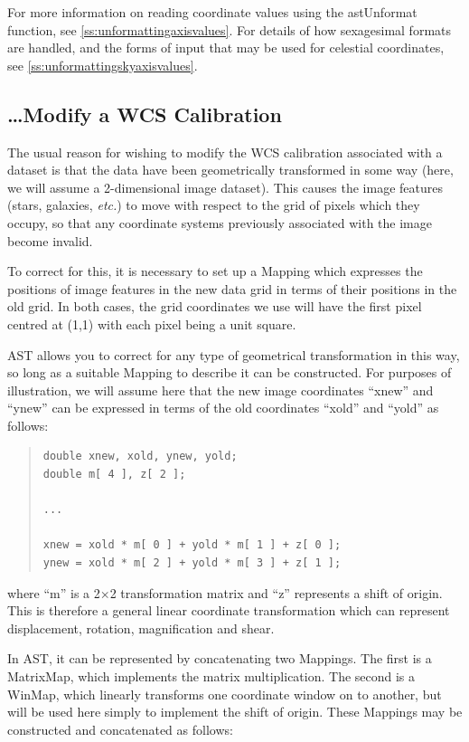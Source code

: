 \documentclass[twoside,11pt]{article}
\newcommand{\htmlref}[2]{#1}
\newcommand{\secref}[1]{\S\ref{#1}}
\renewcommand{\secref}[1]{\ref{#1}}
\begin{document}
For more information on reading coordinate values using the
\htmlref{astUnformat}{astUnformat} function, see \secref{ss:unformattingaxisvalues}. For
details of how sexagesimal formats are handled, and the forms of input
that may be used for celestial coordinates, see
\secref{ss:unformattingskyaxisvalues}.

\subsection{\label{ss:howtomodifywcs}\ldots Modify a WCS Calibration}

The usual reason for wishing to modify the WCS calibration associated
with a dataset is that the data have been geometrically transformed in
some way (here, we will assume a 2-dimensional image dataset). This
causes the image features (stars, galaxies, {\em{etc.}}) to move with
respect to the grid of pixels which they occupy, so that any
coordinate systems previously associated with the image become
invalid.

To correct for this, it is necessary to set up a \htmlref{Mapping}{Mapping} which
expresses the positions of image features in the new data grid in
terms of their positions in the old grid. In both cases, the grid
coordinates we use will have the first pixel centred at (1,1) with
each pixel being a unit square.

AST allows you to correct for any type of geometrical transformation
in this way, so long as a suitable Mapping to describe it can be
constructed. For purposes of illustration, we will assume here that
the new image coordinates ``xnew'' and ``ynew'' can be expressed in
terms of the old coordinates ``xold'' and ``yold'' as follows:

\begin{quote}
\small
\begin{verbatim}
double xnew, xold, ynew, yold;
double m[ 4 ], z[ 2 ];

...

xnew = xold * m[ 0 ] + yold * m[ 1 ] + z[ 0 ];
ynew = xold * m[ 2 ] + yold * m[ 3 ] + z[ 1 ];
\end{verbatim}
\normalsize
\end{quote}

where ``m'' is a 2$\times$2 transformation matrix and ``z'' represents
a shift of origin. This is therefore a general linear coordinate
transformation which can represent displacement, rotation,
magnification and shear.

In AST, it can be represented by concatenating two Mappings. The first
is a \htmlref{MatrixMap}{MatrixMap}, which implements the matrix multiplication. The second
is a \htmlref{WinMap}{WinMap}, which linearly transforms one coordinate window on to
another, but will be used here simply to implement the shift of
origin. These Mappings may be constructed and concatenated as follows:
\end{document}

